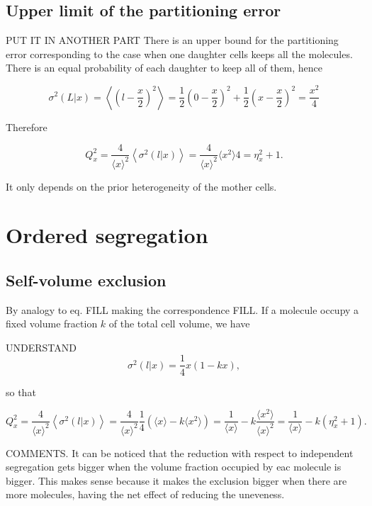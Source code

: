 \subsection{Upper limit of the partitioning error}
PUT IT IN ANOTHER PART
There is an upper bound for the partitioning error corresponding to the case when one daughter cells keeps all the molecules. There is an equal probability of each daughter to keep all of them, hence

\begin{equation}
  \sigma^2(L|x) = \left\langle\left(l-\frac{x}{2}\right)^2\right\rangle = \frac{1}{2}\left(0-\frac{x}{2}\right)^2+\frac{1}{2}\left(x-\frac{x}{2}\right)^2 = \frac{x^2}{4}
\end{equation}

Therefore

\begin{equation}
  Q_x^2 = \frac{4}{\langle x\rangle^2}\left\langle\sigma^2(l|x)\right\rangle = \frac{4}{\langle x\rangle^2}{\langle x^2\rangle}{4} = \eta_x^2+1.
\end{equation}

It only depends on the prior heterogeneity of the mother cells.

\section{Ordered segregation}

\subsection{Self-volume exclusion}

By analogy to eq. FILL making the correspondence FILL. If a molecule occupy a fixed volume fraction $k$ of the total cell volume, we have

UNDERSTAND
\begin{equation}
  \sigma^2(l|x) = \frac{1}{4}x(1-kx),
\end{equation}

so that

\begin{equation}
  Q_x^2 = \frac{4}{\langle x\rangle^2}\left\langle \sigma^2(l|x)\right\rangle = \frac{4}{\langle x\rangle^2}\frac{1}{4}\left(\langle x\rangle-k\langle x^2\rangle\right) = \frac{1}{\langle x\rangle} - k\frac{\langle x^2\rangle}{\langle x\rangle^2} = \frac{1}{\langle x\rangle} - k(\eta_x^2+1).
\end{equation}

COMMENTS. It can be noticed that the reduction with respect to independent segregation gets bigger when the volume fraction occupied by eac molecule is bigger. This makes sense because it makes the exclusion bigger when there are more molecules, having the net effect of reducing the uneveness.

